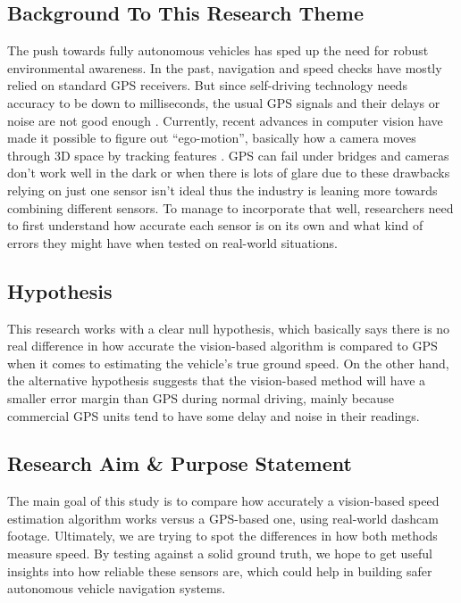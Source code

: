 \subsection{Background To This Research Theme}
\par The push towards fully autonomous vehicles has sped up the need for robust environmental awareness. In the past, navigation and speed checks have mostly relied on standard GPS receivers. But since self-driving technology needs accuracy to be down to milliseconds, the usual GPS signals and their delays or noise are not good enough \cite{cui2003autonomous}. Currently, recent advances in computer vision have made it possible to figure out “ego-motion”, basically how a camera moves through 3D space by tracking features \cite{pp2024video}. GPS can fail under bridges and cameras don’t work well in the dark or when there is lots of glare due to these drawbacks relying on just one sensor isn’t ideal thus the industry is leaning more towards combining different sensors. To manage to incorporate that well, researchers need to first understand how accurate each sensor is on its own and what kind of errors they might have when tested on real-world situations.
\subsection{Hypothesis}
\par This research works with a clear null hypothesis, which basically says there is no real difference in how accurate the vision-based algorithm is compared to GPS when it comes to estimating the vehicle’s true ground speed. On the other hand, the alternative hypothesis suggests that the vision-based method will have a smaller error margin than GPS during normal driving, mainly because commercial GPS units tend to have some delay and noise in their readings.
\subsection{Research Aim \& Purpose Statement}
\par The main goal of this study is to compare how accurately a vision-based speed estimation algorithm works versus a GPS-based one, using real-world dashcam footage. Ultimately, we are trying to spot the differences in how both methods measure speed. By testing against a solid ground truth, we hope to get useful insights into how reliable these sensors are, which could help in building safer autonomous vehicle navigation systems.
